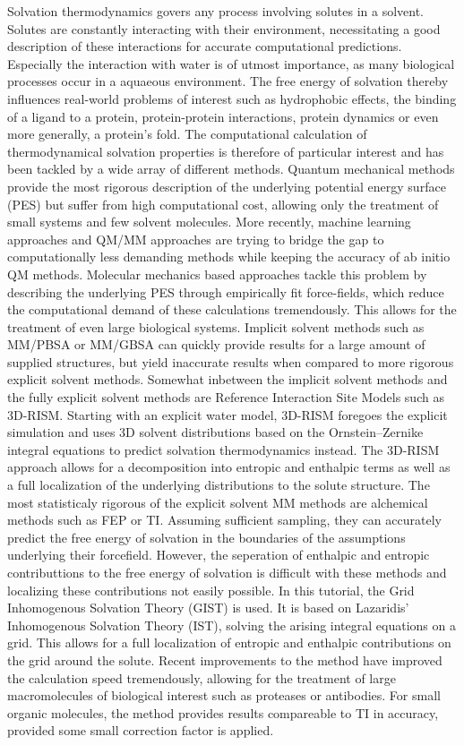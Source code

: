 \documentclass[9pt,tutorial]{livecoms}
\begin{document}
Solvation thermodynamics govers any process involving solutes in a solvent.
Solutes are constantly interacting with their environment, necessitating a good description of these interactions for accurate computational predictions. 
Especially the interaction with water is of utmost importance, as many biological processes occur in a aquaeous environment. 
The free energy of solvation thereby influences real-world problems of interest such as hydrophobic effects, the binding of a ligand to a protein, protein-protein interactions, protein dynamics or even more generally, a protein's fold.
The computational calculation of thermodynamical solvation properties is therefore of particular interest and has been tackled by a wide array of different methods.   
Quantum mechanical methods provide the most rigorous description of the underlying potential energy surface (PES) but suffer from high computational cost, allowing only the treatment of small systems and few solvent molecules. 
More recently, machine learning approaches and QM/MM approaches are trying to bridge the gap to computationally less demanding methods while keeping the accuracy of ab initio QM methods.
Molecular mechanics based approaches tackle this problem by describing the underlying PES through empirically fit force-fields, which reduce the computational demand of these calculations tremendously.
This allows for the treatment of even large biological systems. 
Implicit solvent methods such as MM/PBSA  or MM/GBSA can quickly provide results for a large amount of supplied structures, but yield inaccurate results when compared to more rigorous explicit solvent methods. Somewhat inbetween the implicit solvent methods and the fully explicit solvent methods are Reference Interaction Site Models such as 3D-RISM. 
Starting with an explicit water model, 3D-RISM foregoes the explicit simulation and uses 3D solvent distributions based on the Ornstein--Zernike integral equations to predict solvation thermodynamics instead.
The 3D-RISM approach allows for a decomposition into entropic and enthalpic terms as well as a full localization of the underlying distributions to the solute structure.
The most statisticaly rigorous of the explicit solvent MM methods are alchemical methods such as FEP or TI. 
Assuming sufficient sampling, they can accurately predict the free energy of solvation in the boundaries of the assumptions underlying their forcefield. 
However, the seperation of enthalpic and entropic contributtions to the free energy of solvation is difficult with these methods and localizing these contributions not easily possible.
In this tutorial, the Grid Inhomogenous Solvation Theory (GIST) is used. It is based on Lazaridis' Inhomogenous Solvation Theory (IST), solving the arising integral equations on a grid. This allows for a full localization of entropic and enthalpic contributions on the grid around the solute. Recent improvements to the method have improved the calculation speed tremendously, allowing for the treatment of large macromolecules of biological interest such as proteases or antibodies. For small organic molecules, the method provides results compareable to TI in accuracy, provided some small correction factor is applied. 
\end{document}
